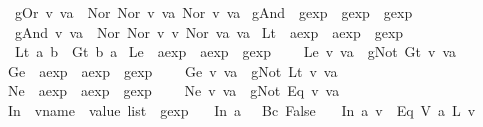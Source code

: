 \begin{isabellebody}
\ \ {\isachardoublequoteopen}gOr\ v\ va\ {\isasymequiv}\ Nor\ {\isacharparenleft}Nor\ v\ va{\isacharparenright}\ {\isacharparenleft}Nor\ v\ va{\isacharparenright}{\isachardoublequoteclose}\isanewline
\isanewline
{}\isamarkupfalse%
\ gAnd\ {\isacharcolon}{\isacharcolon}\ {\isachardoublequoteopen}gexp\ {\isasymRightarrow}\ gexp\ {\isasymRightarrow}\ gexp{\isachardoublequoteclose}\ \ \isanewline
\ \ {\isachardoublequoteopen}gAnd\ v\ va\ {\isasymequiv}\ Nor\ {\isacharparenleft}Nor\ v\ v{\isacharparenright}\ {\isacharparenleft}Nor\ va\ va{\isacharparenright}{\isachardoublequoteclose}\isanewline
\isanewline
{}\isamarkupfalse%
\ Lt\ {\isacharcolon}{\isacharcolon}\ {\isachardoublequoteopen}aexp\ {\isasymRightarrow}\ aexp\ {\isasymRightarrow}\ gexp{\isachardoublequoteclose}\ \ \isanewline
\ \ {\isachardoublequoteopen}Lt\ a\ b\ {\isasymequiv}\ Gt\ b\ a{\isachardoublequoteclose}\isanewline
\isanewline
{}\isamarkupfalse%
\ Le\ {\isacharcolon}{\isacharcolon}\ {\isachardoublequoteopen}aexp\ {\isasymRightarrow}\ aexp\ {\isasymRightarrow}\ gexp{\isachardoublequoteclose}\ \ \isanewline
\ \ {\isachardoublequoteopen}Le\ v\ va\ {\isasymequiv}\ gNot\ {\isacharparenleft}Gt\ v\ va{\isacharparenright}{\isachardoublequoteclose}\isanewline
\isanewline
{}\isamarkupfalse%
\ Ge\ {\isacharcolon}{\isacharcolon}\ {\isachardoublequoteopen}aexp\ {\isasymRightarrow}\ aexp\ {\isasymRightarrow}\ gexp{\isachardoublequoteclose}\ \ \isanewline
\ \ {\isachardoublequoteopen}Ge\ v\ va\ {\isasymequiv}\ gNot\ {\isacharparenleft}Lt\ v\ va{\isacharparenright}{\isachardoublequoteclose}\isanewline
\isanewline
{}\isamarkupfalse%
\ Ne\ {\isacharcolon}{\isacharcolon}\ {\isachardoublequoteopen}aexp\ {\isasymRightarrow}\ aexp\ {\isasymRightarrow}\ gexp{\isachardoublequoteclose}\ \ \isanewline
\ \ {\isachardoublequoteopen}Ne\ v\ va\ {\isasymequiv}\ gNot\ {\isacharparenleft}Eq\ v\ va{\isacharparenright}{\isachardoublequoteclose}\isanewline
\isanewline
{}\isamarkupfalse%
\ In\ {\isacharcolon}{\isacharcolon}\ {\isachardoublequoteopen}vname\ {\isasymRightarrow}\ value\ list\ {\isasymRightarrow}\ gexp{\isachardoublequoteclose}\ \isanewline
\ \ {\isachardoublequoteopen}In\ a\ {\isacharbrackleft}{\isacharbrackright}\ {\isacharequal}\ Bc\ False{\isachardoublequoteclose}\ {\isacharbar}\isanewline
\ \ {\isachardoublequoteopen}In\ a\ {\isacharbrackleft}v{\isacharbrackright}\ {\isacharequal}\ Eq\ {\isacharparenleft}V\ a{\isacharparenright}\ {\isacharparenleft}L\ v{\isacharparenright}{\isachardoublequoteclose}\ {\isacharbar}\isanewline

\end{isabellebody}
